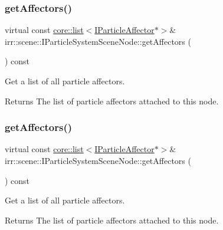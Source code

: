 \subsubsection{\texorpdfstring{get\+Affectors()}{getAffectors()}\hspace{0.1cm}{\footnotesize\ttfamily [1/2]}}
{\footnotesize\ttfamily virtual const \hyperlink{classirr_1_1core_1_1list}{core\+::list}$<$\hyperlink{classirr_1_1scene_1_1IParticleAffector}{I\+Particle\+Affector}$\ast$$>$\& irr\+::scene\+::\+I\+Particle\+System\+Scene\+Node\+::get\+Affectors (\begin{DoxyParamCaption}{ }\end{DoxyParamCaption}) const\hspace{0.3cm}{\ttfamily [pure virtual]}}



Get a list of all particle affectors. 

\begin{DoxyReturn}{Returns}
The list of particle affectors attached to this node. 
\end{DoxyReturn}
\mbox{\label{classirr_1_1scene_1_1IParticleSystemSceneNode_a3a9159e6ec5869814fdf879c5a7c41a3}} 
\subsubsection{\texorpdfstring{get\+Affectors()}{getAffectors()}\hspace{0.1cm}{\footnotesize\ttfamily [2/2]}}
{\footnotesize\ttfamily virtual const \hyperlink{classirr_1_1core_1_1list}{core\+::list}$<$\hyperlink{classirr_1_1scene_1_1IParticleAffector}{I\+Particle\+Affector}$\ast$$>$\& irr\+::scene\+::\+I\+Particle\+System\+Scene\+Node\+::get\+Affectors (\begin{DoxyParamCaption}{ }\end{DoxyParamCaption}) const\hspace{0.3cm}{\ttfamily [pure virtual]}}



Get a list of all particle affectors. 

\begin{DoxyReturn}{Returns}
The list of particle affectors attached to this node. 
\end{DoxyReturn}
\mbox{\label{classirr_1_1scene_1_1IParticleSystemSceneNode_a2f1a12f030ad5aadfd8d1be24021c7d5}} 
